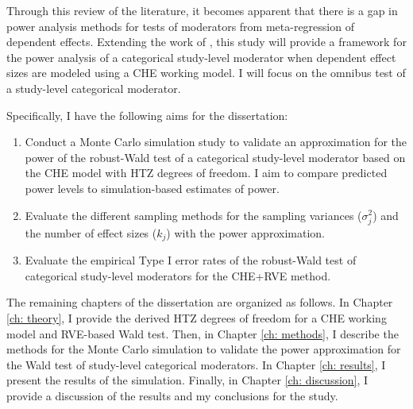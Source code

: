 Through this review of the literature, it becomes apparent that there is a gap in power analysis methods for tests of moderators from meta-regression of dependent effects. Extending the work of \textcite{vembye2023}, this study will provide a framework for the power analysis of a categorical study-level moderator when dependent effect sizes are modeled using a CHE working model. I will focus on the omnibus test of a study-level categorical moderator.  

Specifically, I have the following aims for the dissertation: 
\begin{enumerate}
\item Conduct a Monte Carlo simulation study to validate an approximation for the power of the robust-Wald test of a categorical study-level moderator based on the CHE model with HTZ degrees of freedom. I aim to compare predicted power levels to simulation-based estimates of power.
\item Evaluate the different sampling methods for the sampling variances ($\sigma^2_j$) and the number of effect sizes ($k_j$) with the power approximation. 
\item Evaluate the empirical Type I error rates of the robust-Wald test of categorical study-level moderators for the CHE+RVE method.
\end{enumerate}

The remaining chapters of the dissertation are organized as follows. In Chapter \ref{ch: theory}, I provide the derived HTZ degrees of freedom for a CHE working model and RVE-based Wald test. Then, in Chapter \ref{ch: methods}, I describe the methods for the Monte Carlo simulation to validate the power approximation for the Wald test of study-level categorical moderators. In Chapter \ref{ch: results}, I present the results of the simulation. Finally, in Chapter \ref{ch: discussion}, I provide a discussion of the results and my conclusions for the study.  

